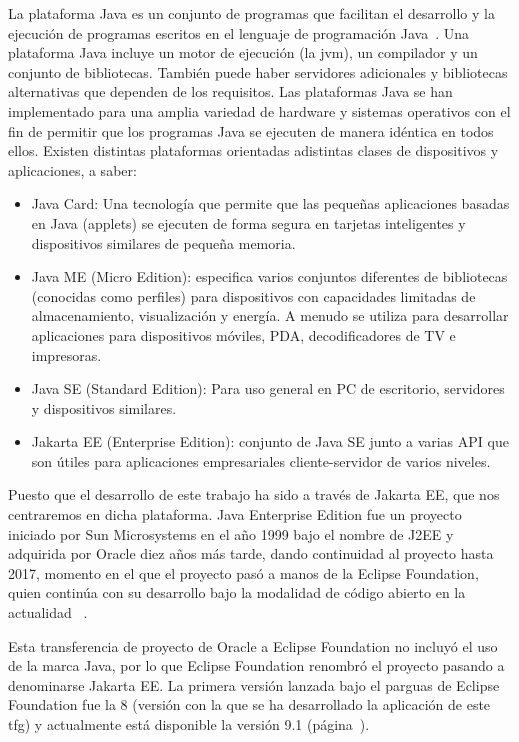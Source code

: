 La plataforma Java es un conjunto de programas que facilitan el desarrollo y la ejecución de programas escritos en el lenguaje de programación Java~\cite{WikiJavaSwPlatform}. Una plataforma Java incluye un motor de ejecución (la \acrshort{jvm}), un compilador y un conjunto de bibliotecas. También puede haber servidores adicionales y bibliotecas alternativas que dependen de los requisitos. Las plataformas Java se han implementado para una amplia variedad de hardware y sistemas operativos con el fin de permitir que los programas Java se ejecuten de manera idéntica en todos ellos. Existen distintas plataformas orientadas adistintas clases de dispositivos y aplicaciones, a saber:

\begin{itemize}
\item Java Card: Una tecnología que permite que las pequeñas aplicaciones basadas en Java (applets) se ejecuten de forma segura en tarjetas inteligentes y dispositivos similares de pequeña memoria. 
\item Java ME (Micro Edition): especifica varios conjuntos diferentes de bibliotecas (conocidas como perfiles) para dispositivos con capacidades limitadas de almacenamiento, visualización y energía. A menudo se utiliza para desarrollar aplicaciones para dispositivos móviles, PDA, decodificadores de TV e impresoras. 
\item Java SE (Standard Edition): Para uso general en PC de escritorio, servidores y dispositivos similares. 
\item Jakarta EE (Enterprise Edition): conjunto de Java SE junto a varias API que son útiles para aplicaciones empresariales cliente-servidor de varios niveles.
\end{itemize}


Puesto que el desarrollo de este trabajo ha sido a través de Jakarta EE, que nos centraremos en dicha plataforma. Java Enterprise Edition fue un proyecto iniciado por Sun Microsystems en el año 1999 bajo el nombre de J2EE y adquirida por Oracle diez años más tarde, dando continuidad al proyecto hasta 2017, momento en el que el proyecto pasó a manos de la Eclipse Foundation, quien continúa con su desarrollo bajo la modalidad de código abierto en la actualidad ~\cite{JakartaEE-eclipse}.

Esta transferencia de proyecto de Oracle a Eclipse Foundation no incluyó el uso de la marca Java, por lo que Eclipse Foundation renombró el proyecto pasando a denominarse Jakarta EE. La primera versión lanzada bajo el parguas de Eclipse Foundation fue la 8 (versión con la que se ha desarrollado la aplicación de este \acrshort{tfg}) y actualmente está disponible la versión 9.1 (página~\pageref{tab:evolucionJavaEE}).


